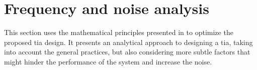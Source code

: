 \section{Frequency and noise analysis}\label{chap:td:calc:v2}

This section uses the mathematical principles presented in \cite{margan2012transimpedance, sackinger2017analysis, horsthemke2025all} to optimize the proposed \gls{tia} design. It presents an analytical approach to designing a \gls{tia}, taking into account the general practices, but also considering more subtle factors that might hinder the performance of the system and increase the noise.

